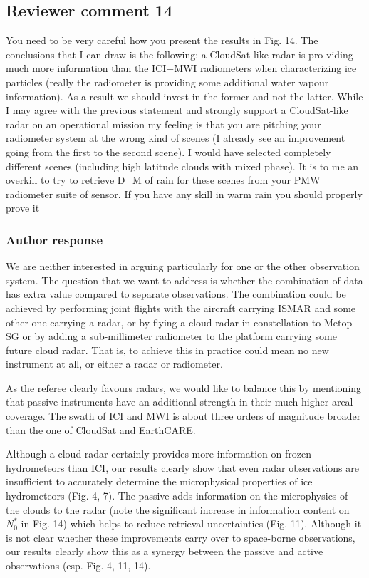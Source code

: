 \documentclass[11pt]{scrartcl}
\begin{document}
\subsection*{Reviewer comment 14}
You need to be very careful how you present the results in Fig. 14. The
conclusions that I can draw is the following: a CloudSat like radar is
pro-viding much more information than the ICI+MWI radiometers when
characterizing ice particles (really the radiometer is providing some additional
water vapour information). As a result we should invest in the former and not the
latter. While I may agree with the previous statement and strongly support a
CloudSat-like radar on an operational mission my feeling is that you are
pitching your radiometer system at the wrong kind of scenes (I already see an
improvement going from the first to the second scene). I would have selected
completely different scenes (including high latitude clouds with mixed phase). It
is to me an overkill to try to retrieve D\_M of rain for these scenes from your
PMW radiometer suite of sensor. If you have any skill in warm rain you
should properly prove it

\subsubsection*{Author response}

We are neither interested in arguing particularly for one or the other
observation system. The question that we want to address is whether the
combination of data has extra value compared to separate observations. The
combination could be achieved by performing joint flights with the aircraft
carrying ISMAR and some other one carrying a radar, or by flying a cloud radar
in constellation to Metop-SG or by adding a sub-millimeter radiometer to the
platform carrying some future cloud radar. That is, to achieve this in practice
could mean no new instrument at all, or either a radar or radiometer.

As the referee clearly favours radars, we would like to balance this by mentioning that
passive instruments have an additional strength in their much higher areal coverage. The
swath of ICI and MWI is about three orders of magnitude broader than the one of CloudSat
and EarthCARE.

Although a cloud radar certainly provides more information on frozen
hydrometeors than ICI, our results clearly show that even radar observations are
insufficient to accurately determine the microphysical properties of ice
hydrometeors (Fig. 4, 7). The passive adds information on the microphysics of
the clouds to the radar (note the significant increase in information content on
$N_0^*$ in Fig. 14) which helps to reduce retrieval uncertainties (Fig. 11).
Although it is not clear whether these improvements carry over to space-borne
observations, our results clearly show this as a synergy between the passive and
active observations (esp. Fig. 4, 11, 14).
\end{document}
